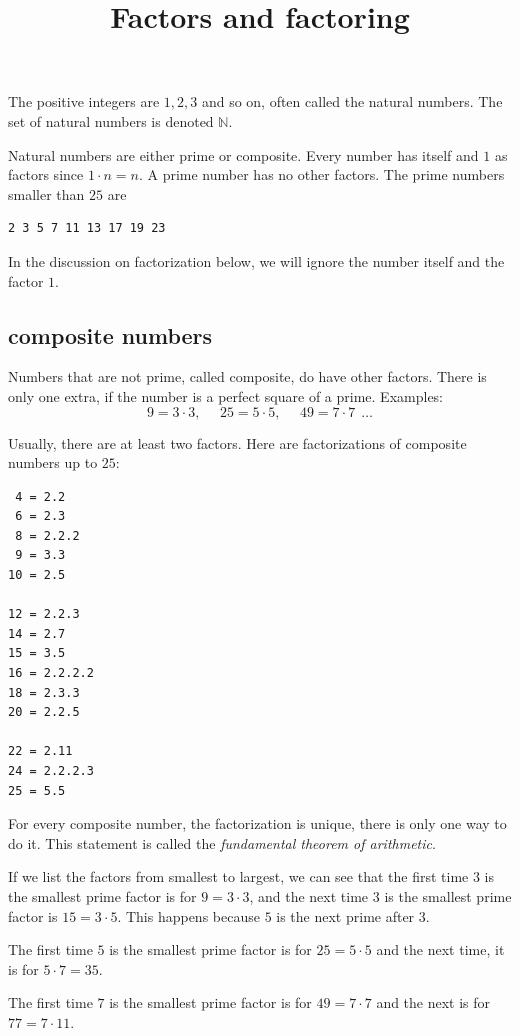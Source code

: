 \documentclass[11pt, oneside]{article}
\title{Factors and factoring}
\date{}
\begin{document}
\maketitle
\Large

The positive integers are $1, 2, 3$ and so on, often called the natural numbers.  The set of natural numbers is denoted $\mathbb{N}$.  

Natural numbers are either prime or composite.  Every number has itself and $1$ as factors since $1 \cdot n = n$.  A prime number has no other factors.  The prime numbers smaller than $25$ are
\begin{verbatim}
2 3 5 7 11 13 17 19 23 
\end{verbatim}
In the discussion on factorization below, we will ignore the number itself and the factor $1$. 

\subsection*{composite numbers}

Numbers that are not prime, called composite, do have other factors.  There is only one extra, if the number is a perfect square of a prime.  Examples:
\[ 9 = 3 \cdot 3, \ \ \ \ \ \ 25 = 5 \cdot 5, \ \ \ \ \ \  49 = 7 \cdot 7 \ \ \dots \]

Usually, there are at least two factors.  Here are factorizations of composite numbers up to $25$:

\begin{verbatim}
 4 = 2.2
 6 = 2.3
 8 = 2.2.2
 9 = 3.3
10 = 2.5

12 = 2.2.3
14 = 2.7
15 = 3.5
16 = 2.2.2.2
18 = 2.3.3
20 = 2.2.5

22 = 2.11
24 = 2.2.2.3
25 = 5.5
\end{verbatim}

For every composite number, the factorization is unique, there is only one way to do it.  This statement is called the \emph{fundamental theorem of arithmetic}.

If we list the factors from smallest to largest, we can see that the first time $3$ is the smallest prime factor is for $9 = 3 \cdot 3$, and the next time $3$ is the smallest prime factor is $15 = 3 \cdot 5$.  This happens because $5$ is the next prime after $3$.

The first time $5$ is the smallest prime factor is for $25 = 5 \cdot 5$ and the next time, it is for $5 \cdot 7 = 35$.

The first time $7$ is the smallest prime factor is for $49 = 7 \cdot 7$ and the next is for $77 = 7 \cdot 11$.  
\end{document}

